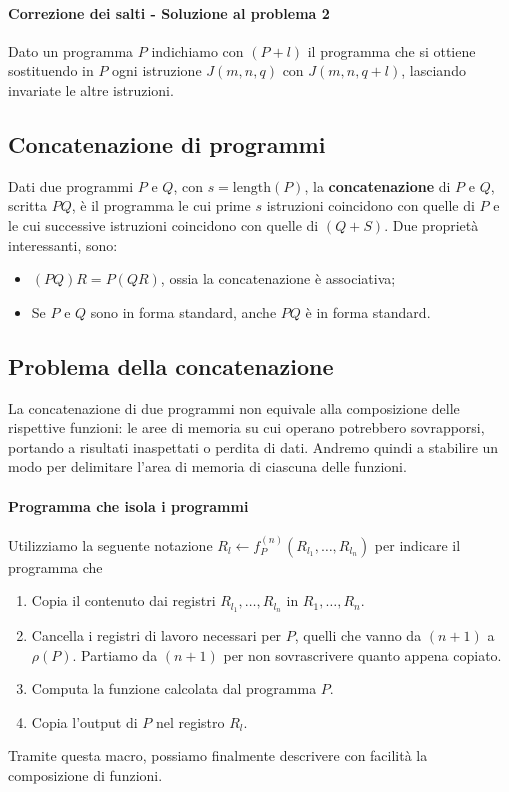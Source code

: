 	\paragraph{Correzione dei salti - Soluzione al problema 2}
	Dato un programma $P$ indichiamo con $(P+l)$ il programma che si ottiene sostituendo in $P$ ogni istruzione $J(m,n,q)$ con $J(m,n,q+l)$, lasciando invariate le altre istruzioni. 
	
	\subsection{Concatenazione di programmi}
	
	Dati due programmi $P$ e $Q$, con $s = \text{length}(P)$, la \textbf{concatenazione} di $P$ e $Q$, scritta $PQ$, è il programma le cui prime $s$ istruzioni coincidono con quelle di $P$ e le cui successive istruzioni coincidono con quelle di $(Q+S)$.
	Due proprietà interessanti, sono:
	\begin{itemize}
		\item $(PQ)R = P(QR)$, ossia la concatenazione è associativa;
		\item Se $P$ e $Q$ sono in forma standard, anche $PQ$ è in forma standard.
	\end{itemize}
	
	
	\subsection{Problema della concatenazione}
	La concatenazione di due programmi non equivale alla composizione delle rispettive funzioni: le aree di memoria su cui operano potrebbero sovrapporsi, portando a risultati inaspettati o perdita di dati. Andremo quindi a stabilire un modo per delimitare l'area di memoria di ciascuna delle funzioni. 
	
	\paragraph{Programma che isola i programmi}
	Utilizziamo la seguente notazione $R_l \leftarrow f_P^{(n)}(R_{l_1}, \dots, R_{l_n})$ per indicare il programma che
	
	\begin{enumerate}
		\item Copia il contenuto dai registri $R_{l_1}, \dots, R_{l_n}$ in $R_1, \dots, R_n$.
		\item Cancella i registri di lavoro necessari per $P$, quelli che vanno da $(n+1)$ a $\rho(P)$. Partiamo da $(n+1)$ per non sovrascrivere quanto appena copiato.
		\item Computa la funzione calcolata dal programma $P$.
		\item Copia l'output di $P$ nel registro $R_l$.
	\end{enumerate}
	Tramite questa macro, possiamo finalmente descrivere con facilità la composizione di funzioni.
	
